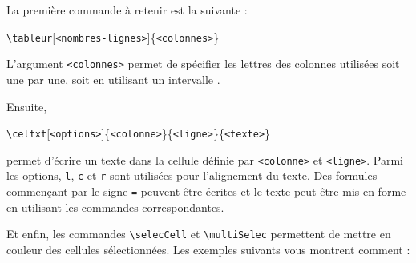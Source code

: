 La première commande à retenir est la suivante :
\begin{center}
    \texttt{\textbackslash tableur}[\texttt{<nombres-lignes>}]\{\texttt{<colonnes>}\}
\end{center}

L'argument \texttt{<colonnes>} permet de spécifier les lettres des colonnes utilisées soit une par une, soit en utilisant un \og intervalle \fg{}.

Ensuite, 
\begin{center}\texttt{\textbackslash celtxt}[\texttt{<options>}]\{\texttt{<colonne>}\}\{\texttt{<ligne>}\}\{\texttt{<texte>}\}\end{center} 
permet d'écrire un texte dans la cellule définie par \texttt{<colonne>} et \texttt{<ligne>}. Parmi les options, \verb!l!, \verb!c! et \verb!r! sont utilisées pour l'alignement du texte. Des formules commençant par le signe \verb!=! peuvent être écrites et le texte peut être mis en forme en utilisant les commandes correspondantes.

Et enfin, les commandes \texttt{\textbackslash selecCell} et \texttt{\textbackslash multiSelec} permettent de mettre en couleur des cellules sélectionnées. Les exemples suivants vous montrent comment :\bigskip

\begin{SideBySideExample}
    \bigskip

    \bigskip

\end{SideBySideExample}
